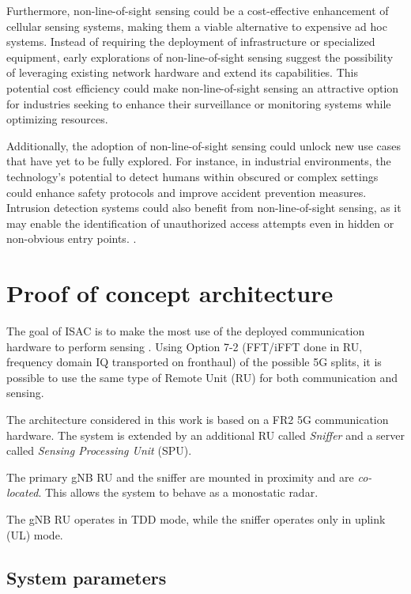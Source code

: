 Furthermore, non-line-of-sight sensing could be a cost-effective enhancement of cellular sensing systems, making them a viable alternative to expensive ad hoc systems. Instead of requiring the deployment of infrastructure or specialized equipment, early explorations of non-line-of-sight sensing suggest the possibility of leveraging existing network hardware and extend its capabilities. This potential cost efficiency could make non-line-of-sight sensing an attractive option for industries seeking to enhance their surveillance or monitoring systems while optimizing resources.

Additionally, the adoption of non-line-of-sight sensing could unlock new use cases that have yet to be fully explored. For instance, in industrial environments, the technology's potential to detect humans within obscured or complex settings could enhance safety protocols and improve accident prevention measures. Intrusion detection systems could also benefit from non-line-of-sight sensing, as it may enable the identification of unauthorized access attempts even in hidden or non-obvious entry points. 
.

\section{Proof of concept architecture}
\label{sec:intro-PoCarchitecture}

The goal of ISAC is to make the most use of the deployed communication hardware to perform sensing \cite{Wild_Grudnitsky_Mandelli_Henninger_Guan_Schaich_2023}. Using Option 7-2 (FFT/iFFT done in RU, frequency domain IQ transported on fronthaul) of the possible 5G splits, it is possible to use the same type of Remote Unit (RU) for both communication and sensing.

The architecture considered in this work is based on a FR2 5G communication hardware. The system is extended by an additional RU called \textit{Sniffer} and a server called \textit{Sensing Processing Unit} (SPU).

The primary gNB RU and the sniffer are mounted in proximity and are \textit{co-located}. This allows the system to behave as a monostatic radar.

The gNB RU operates in TDD mode, while the sniffer operates only in uplink (UL) mode.

\subsection{System parameters}

